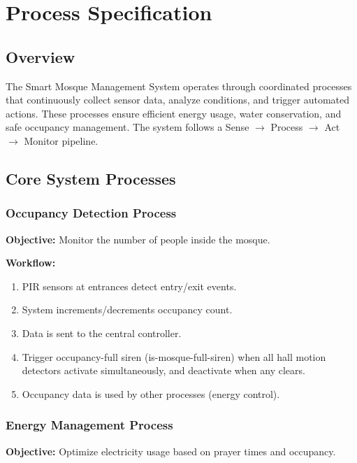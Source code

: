 \section{Process Specification}

\subsection{Overview}
The Smart Mosque Management System operates through coordinated processes that continuously collect sensor data, analyze conditions, and trigger automated actions. These processes ensure efficient energy usage, water conservation, and safe occupancy management. The system follows a Sense $\rightarrow$ Process $\rightarrow$ Act $\rightarrow$ Monitor pipeline.

\subsection{Core System Processes}

\subsubsection{Occupancy Detection Process}
\textbf{Objective:} Monitor the number of people inside the mosque.

\textbf{Workflow:}
\begin{enumerate}
  \item PIR sensors at entrances detect entry/exit events.
  \item System increments/decrements occupancy count.
  \item Data is sent to the central controller.
  \item Trigger occupancy-full siren (is-mosque-full-siren) when all hall motion detectors activate simultaneously, and deactivate when any clears.
  \item Occupancy data is used by other processes (energy control).
\end{enumerate}

\subsubsection{Energy Management Process}
\textbf{Objective:} Optimize electricity usage based on prayer times and occupancy.

